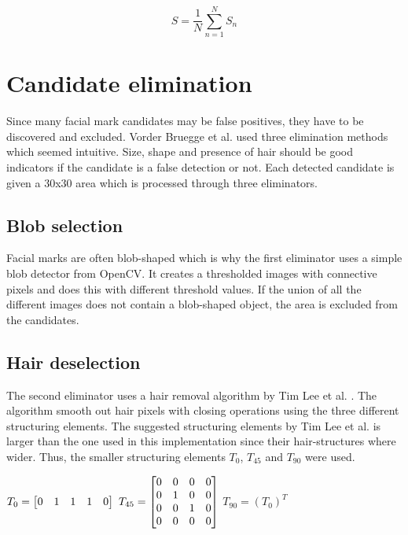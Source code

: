 \begin{equation} \label{eq:M-}
S =\frac{1}{N} \sum_{n=1}^{N} S_n
\end{equation}



\section{Candidate elimination}

Since many facial mark candidates may be false positives, they have to be discovered and excluded. Vorder Bruegge et al. \cite{automatic_detector_2015} used three elimination methods which seemed intuitive. Size, shape and presence of hair should be good indicators if the candidate is a false detection or not. Each detected candidate is given a 30x30 area which is processed through three eliminators. 

\subsection{Blob selection}

Facial marks are often blob-shaped which is why the first eliminator uses a simple blob detector from OpenCV. It creates a thresholded images with connective pixels and does this with different threshold values. If the union of all the different images does not contain a blob-shaped object, the area is excluded from the candidates.  


\subsection{Hair deselection}

The second eliminator uses a hair removal algorithm by Tim Lee et al. \cite{dullrazor}. The algorithm smooth out hair pixels with closing operations using the three different structuring elements. The suggested structuring elements by Tim Lee et al. is larger than the one used in this implementation since their hair-structures where wider. Thus, the smaller structuring elements $T_{0}$, $T_{45}$ and $T_{90}$ were used. \\

\begin{center}
	$T_{0} =
	\left[ \begin{array}{@{}*{5}{c}@{}}
	0 & 1 & 1 & 1 & 0  \\
	\end{array} \right]  $ \quad $T_{45} =
	\left[ \begin{array}{@{}*{4}{c}@{}}
	0 & 0 & 0 & 0 \\
	0 & 1 & 0 & 0 \\
	0 & 0 & 1 & 0 \\
	0 & 0 & 0 & 0  \\
	\end{array} \right]$ \quad $T_{90} = (T_{0})^{T} $ \\
\end{center}


